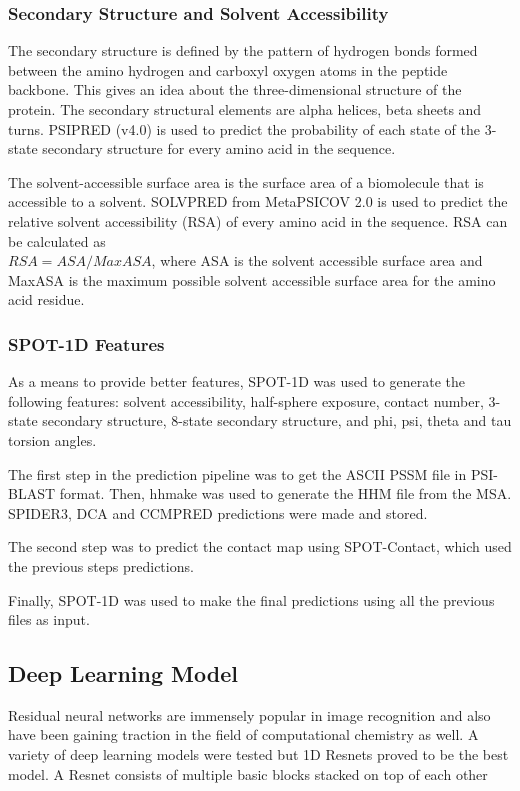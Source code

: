 \documentclass[journal=jacsat,manuscript=article]{achemso}
\begin{document}
\subsubsection{Secondary Structure and Solvent Accessibility}
\quad The secondary structure is defined by the pattern of hydrogen bonds formed between the amino hydrogen and carboxyl oxygen atoms in the peptide backbone. This gives an idea about the three-dimensional structure of the protein. The secondary structural elements are alpha helices, beta sheets and turns. PSIPRED (v4.0) \cite{jones1999protein} is used to predict the probability of each state of the 3-state secondary structure for every amino acid in the sequence.

The solvent-accessible surface area is the surface area of a biomolecule that is accessible to a solvent. SOLVPRED from MetaPSICOV 2.0\cite{jones2015metapsicov} is used to predict the relative solvent accessibility (RSA) of every amino acid in the sequence. RSA can be calculated as \\ ${RSA} = {ASA} / {MaxASA}$, where ASA is the solvent accessible surface area and MaxASA is the maximum possible solvent accessible surface area for the amino acid residue.

\subsubsection{SPOT-1D Features}
\quad As a means to provide better features, SPOT-1D \cite{hanson2019improving} was used to generate the following features: solvent accessibility, half-sphere exposure, contact number, 3-state secondary structure, 8-state secondary structure, and phi, psi, theta and tau torsion angles.

The first step in the prediction pipeline was to get the ASCII PSSM file in PSI-BLAST format. Then, hhmake was used to generate the HHM file from the MSA. SPIDER3, DCA and CCMPRED predictions were made and stored.

The second step was to predict the contact map using SPOT-Contact, which used the previous steps predictions.

Finally, SPOT-1D was used to make the final predictions using all the previous files as input.

\subsection{Deep Learning Model}
\quad Residual neural networks are immensely popular in image recognition and also have been gaining traction in the field of computational chemistry as well. A variety of deep learning models were tested but 1D Resnets proved to be the best model. A Resnet consists of multiple basic blocks stacked on top of each other
\end{document}
